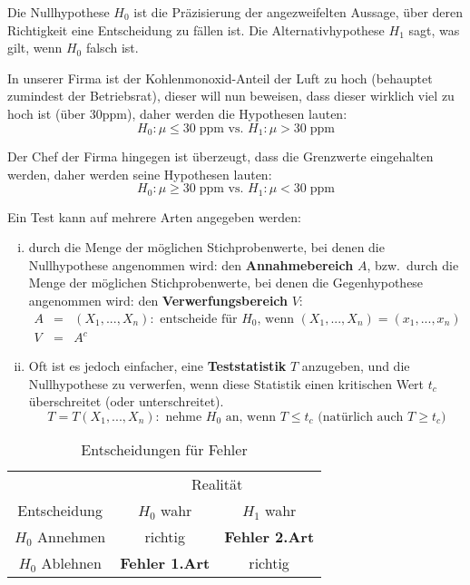 Die Nullhypothese $H_0$ ist die Präzisierung der angezweifelten Aussage, über deren Richtigkeit eine Entscheidung zu fällen ist. Die Alternativhypothese $H_1$ sagt, was gilt, wenn $H_0$ falsch ist.

\begin{bsp}
In unserer Firma ist der Kohlenmonoxid-Anteil der Luft zu hoch (behauptet zumindest der Betriebsrat), dieser will nun beweisen, dass dieser wirklich viel zu hoch ist (über 30ppm), daher werden die Hypothesen lauten: 
\[H_0\colon\mu\leq 30\;\mathrm{ppm}\text{ vs. }H_1\colon\mu>30\;\mathrm{ppm}\]

Der Chef der Firma hingegen ist überzeugt, dass die Grenzwerte eingehalten werden, daher werden seine Hypothesen lauten: 
\[H_0\colon \mu\geq 30\;\mathrm{ppm}\text{ vs. }H_1\colon\mu < 30\;\mathrm{ppm}\]
\end{bsp}

Ein Test kann auf mehrere Arten angegeben werden: 
\begin{enumerate}[i)] 
    \item durch die Menge der möglichen Stichprobenwerte, bei denen die Nullhypothese angenommen wird: den \textbf{Annahmebereich} $A$, 
    bzw.\ durch die Menge der möglichen Stichprobenwerte, bei denen die Gegenhypothese angenommen wird: den \textbf{Verwerfungsbereich} $V$:
    \begin{eqnarray*}
        A&=&(X_1,...,X_n): \text{ entscheide für $H_0$, wenn } (X_1,...,X_n)=(x_1,...,x_n)\\
        V&=&A^c
    \end{eqnarray*}
    \item Oft ist es jedoch einfacher, eine \textbf{Teststatistik} $T$ anzugeben, und die Nullhypothese zu verwerfen, wenn diese Statistik einen kritischen Wert $t_c$ überschreitet (oder unterschreitet).
    \[T=T(X_1,...,X_n):\text{ nehme $H_0$ an, wenn } T\leq t_c \text{ (natürlich auch } T\geq t_c)\]
\end{enumerate}

\begin{table}
    \centering
    \begin{tabular}{|ccc|}
        \hline
        \rowcolor{blue!10}&\multicolumn{2}{c|}{Realität}\\
        \rowcolor{blue!10}Entscheidung & $H_0$ wahr & $H_1$ wahr\\
        \hline
        $H_0$ Annehmen & richtig & \textbf{Fehler 2.Art} \\
        $H_0$ Ablehnen & \textbf{Fehler 1.Art} & richtig \\
        \hline
    \end{tabular}
    \caption{Entscheidungen für Fehler}\label{tab:hypothese_fehler}
\end{table}

